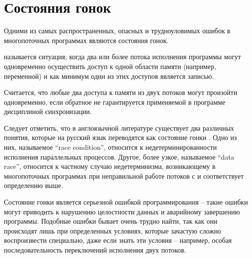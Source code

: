
\section{Состояния гонок}

Одними из самых распространенных, опасных и трудноуловимых ошибок в многопоточных программах являются состояния гонок.

\begin{definition}
 называется ситуация, когда два или более потока исполнения программы могут одновременно осуществить доступ к одной области памяти (например, переменной) и как минимум один из этих доступов является записью.
\end{definition}

Считается, что любые два доступа к памяти из двух потоков могут произойти одновременно, если обратное не гарантируется применяемой в программе дисциплиной синхронизации.

Следует отметить, что в англоязычной литературе существует два различных понятия, которые на русский язык переводятся как состояние гонки \cite{timur}.
Одно из них, называемое \textquotedblleft race condition\textquotedblright , относится к недетерминированности исполнения параллельных процессов.
Другое, более узкое, называемое \textquotedblleft data race\textquotedblright , относится к частному случаю недетерминизма, возникающему в многопоточных программах при неправильной работе потоков с  и соответствует определению выше.

Состояние гонки является серьезной ошибкой программирования -- такие ошибки могут приводить к нарушению целостности данных и аварийному завершению программы.
Подобные ошибки бывает очень трудно найти, так как они происходят лишь при определенных условиях, которые зачастую сложно воспроизвести специально, даже если знать эти условия -- например, особая последовательность переключений исполнения двух потоков.

